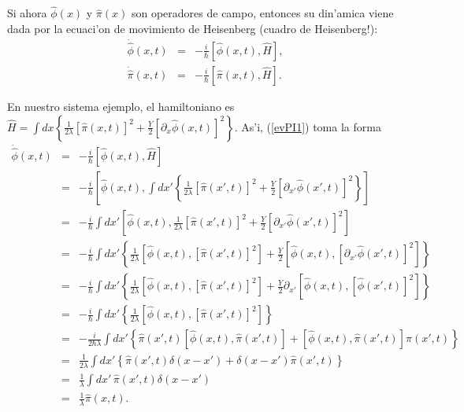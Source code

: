 Si ahora $\hat{\phi}(x) $ y $\hat{\pi}(x) $ son operadores de campo, entonces su
din'amica viene dada por la ecuaci'on de movimiento de Heisenberg (cuadro de
Heisenberg!):
\begin{eqnarray}
\dot{\hat{\phi}}(x,t) & = &-\frac{i}{\hbar}\left[ \hat{\phi}(x,t)
,\hat{H}\right] , \label{evPI1}\\
\dot{\hat{\pi}}(x,t) & = &-\frac{i}{\hbar}\left[\hat{\pi}(x,t),\hat{H} \right]
\label{evPI} .
\end{eqnarray}

En nuestro sistema ejemplo, el hamiltoniano es $\hat{H}=\int dx\left\{
\frac{1}{2\lambda}\left[ \hat{\pi}(x,t)\right]^2 +\frac{Y}{2}\left[ \partial_x
\hat{\phi} (x,t)\right]^2 \right\}$.
As'i, (\ref{evPI1}) toma la forma
\begin{eqnarray}
\dot{\hat{\phi}}(x,t) & = &-\frac{i}{\hbar}\left[ \hat{\phi}(x,t)
,\hat{H}\right] \\
 & = &-\frac{i}{\hbar}\left[ \hat{\phi}(x,t) ,\int dx'\left\{
\frac{1}{2\lambda}\left[ \hat{\pi}(x',t)\right]^2 +\frac{Y}{2}\left[
\partial_{x'} \hat{\phi} (x',t)\right]^2 \right\}\right]  \\
 & = &-\frac{i}{\hbar}\int dx'\left[ \hat{\phi}(x,t) , \frac{1}{2\lambda}\left[
\hat{\pi}(x',t)\right]^2 +\frac{Y}{2}\left[ \partial_{x'} \hat{\phi}
(x',t)\right]^2\right] \\
 & = &-\frac{i}{\hbar}\int dx'\left\{\frac{1}{2\lambda}\left[ \hat{\phi}(x,t) ,
\left[ \hat{\pi}(x',t)\right]^2\right] +\frac{Y}{2}\left[ \hat{\phi}(x,t) ,
\left[ \partial_{x'} \hat{\phi} (x',t)\right]^2\right] \right\}\\
 & = &-\frac{i}{\hbar}\int dx'\left\{\frac{1}{2\lambda}\left[ \hat{\phi}(x,t) ,
\left[ \hat{\pi}(x',t)\right]^2\right] +\frac{Y}{2}\partial_{x'}\left[
\hat{\phi}(x,t) , \left[  \hat{\phi} (x',t)\right]^2\right] \right\} \\
 & = &-\frac{i}{\hbar}\int dx'\left\{\frac{1}{2\lambda}\left[ \hat{\phi}(x,t) ,
\left[ \hat{\pi}(x',t)\right]^2\right]  \right\}\\
 & = &-\frac{i}{2\hbar\lambda}\int dx'\left\{\hat{\pi}(x',t)\left[
\hat{\phi}(x,t) , \hat{\pi}(x',t)\right] +\left[ \hat{\phi}(x,t) ,
\hat{\pi}(x',t)\right]\hat{\pi}(x',t)  \right\}\\
 & = &\frac{1}{2\lambda}\int dx'\left\{\hat{\pi}(x',t)\delta (x-x') +\delta
(x-x') \hat{\pi}(x',t)  \right\}\\
 & = &\frac{1}{\lambda}\int dx'\,\hat{\pi}(x',t)\delta (x-x') \\
 & = &\frac{1}{\lambda}\hat{\pi}(x,t).
\end{eqnarray}
